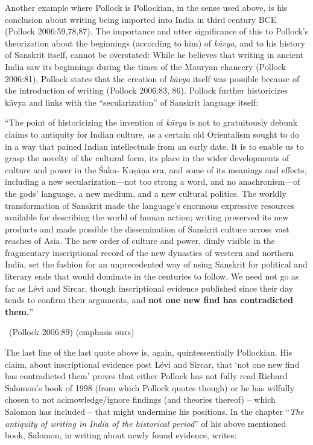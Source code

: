 Another example where Pollock is Pollockian, in the sense used above, is his conclusion about writing being imported into India in third century BCE (Pollock 2006:59,78,87). The importance and utter significance of this to Pollock’s theorization about the beginnings (according to him) of \textit{kāvya}, and to his history of Sanskrit itself, cannot be overstated: While he believes that writing in ancient India saw its beginnings during the times of the Mauryan chancery (Pollock 2006:81), Pollock states that the creation of \textit{kāvya} itself was possible because of the introduction of writing (Pollock 2006:83, 86). Pollock further historicizes kāvya and links with the “secularization” of Sanskrit language itself: 

\vskip 4pt

\begin{myquote}
“The point of historicizing the invention of \textit{kāvya} is not to gratuitously debunk claims to antiquity for Indian culture, as a certain old Orientalism sought to do in a way that pained Indian intellectuals from an early date. It is to enable us to grasp the novelty of the cultural form, its place in the wider developments of culture and power in the Śaka- Kuṣāṇa era, and some of its meanings and effects, including a new secularization—not too strong a word, and no anachronism—of the gods’ language, a new medium, and a new cultural politics. The worldly transformation of Sanskrit made the language’s enormous expressive resources available for describing the world of human action; writing preserved its new products and made possible the dissemination of Sanskrit culture across vast reaches of Asia. The new order of culture and power, dimly visible in the fragmentary inscriptional record of the new dynasties of western and northern India, set the fashion for an unprecedented way of using Sanskrit for political and literary ends that would dominate in the centuries to follow. We need not go as far as Lévi and Sircar, though inscriptional evidence published since their day tends to confirm their arguments, and \textbf{not one new find has contradicted them.}” 

~\hfill (Pollock 2006:89) (emphasis ours)
\end{myquote}

\vskip 4pt

The last line of the last quote above is, again, quintessentially Pollockian. His claim, about inscriptional evidence post Lévi and Sircar, that ‘not one new find has contradicted them’ proves that either Pollock has not fully read Richard Salomon’s book of 1998 (from which Pollock quotes though) or he has wilfully chosen to not acknowledge/ignore findings (and theories thereof) – which Salomon has included – that might undermine his positions. In the chapter “\textit{The antiquity of writing in India of the historical period}” of his above mentioned book, Salomon, in writing about newly found evidence, writes:

